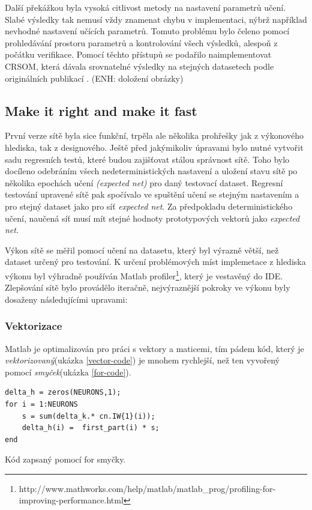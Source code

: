 \documentclass[thesis=M,czech]{FITthesis}[2012/06/26]
\begin{document}
Další překážkou byla vysoká citlivost metody na nastavení parametrů učení\cite{hartono14}. Slabé výsledky tak nemusí vždy znamenat chybu v implementaci, nýbrž například nevhodné nastavení učících parametrů. Tomuto problému bylo čeleno pomocí prohledávání prostoru parametrů a kontrolování všech výsledků, alespoň z počátku verifikace.
Pomocí těchto přístupů se podařilo naimplementovat CRSOM, která dávala srovnatelné výsledky na stejných datasetech podle originálních publikací \cite{hartono14}. (ENH: doložení obrázky)

\subsection{Make it right and make it fast}

První verze sítě byla sice funkční, trpěla ale několika prohřešky jak z výkonového hlediska, tak z designového. Ještě před jakýmikoliv úpravami bylo nutné vytvořit sadu regresních testů, které budou zajišťovat stálou správnost sítě. Toho bylo docíleno odebráním všech nedeterministických nastavení a uložení stavu sítě po několika epochách učení \textit{(expected net)} pro daný testovací dataset.  Regresní testování upravené sítě pak spočívalo ve spuštění učení se stejným nastavením a pro stejný dataset jako pro síť \textit{expected net}. Za předpokladu deterministického učení, naučená síť musí mít stejné hodnoty prototypových vektorů jako \textit{expected net}.

Výkon sítě se měřil pomocí učení na datasetu, který byl výrazně větší, než dataset určený pro testování. K určení problémových míst implemetace z hlediska výkonu byl výhradně používán Matlab profiler\footnote{http://www.mathworks.com/help/matlab/matlab\_prog/profiling-for-improving-performance.html}, který je vestavěný do IDE. Zlepšování sítě bylo provádělo iteračně, nejvýraznější pokroky ve výkonu byly dosaženy následujícími upravami:





\subsubsection*{Vektorizace}
Matlab je optimalizován pro práci s vektory a maticemi, tím pádem kód, který je \textit{vektorizovaný}(ukázka \ref{vector-code}) je mnohem rychlejší\cite{vector}, než ten vyvořený pomocí \textit{smyček}(ukázka \ref{for-code}).


\begin{listing}
\begin{verbatim}
delta_h = zeros(NEURONS,1);
for i = 1:NEURONS
    s = sum(delta_k.* cn.IW{1}(i));
    delta_h(i) =  first_part(i) * s;
end
\end{verbatim} 
\caption{Kód zapsaný pomocí for smyčky.} 
\label{for-code}
\end{listing}
\end{document}
